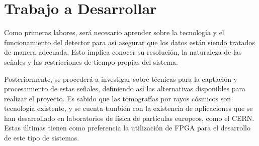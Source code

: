 %		
%		
%			
%			
%			
%		

\section{Trabajo a Desarrollar}

	\par Como primeras labores, será necesario aprender sobre la tecnología y el funcionamiento del detector para así asegurar que los datos están siendo tratados de manera adecuada. Esto implica conocer su resolución, la naturaleza de las señales y las restricciones de tiempo propias del sistema. 
	
	\par Posteriormente, se procederá a investigar sobre técnicas para la captación y procesamiento de estas señales, definiendo así las alternativas disponibles para realizar el proyecto. Es sabido que las tomografías por rayos cósmicos son tecnología existente, y se cuenta también con la existencia de aplicaciones que se han desarrollado en laboratorios de física de partículas europeos, como el CERN. Estas últimas tienen como preferencia la utilización de FPGA para el desarrollo de este tipo de sistemas.
	
